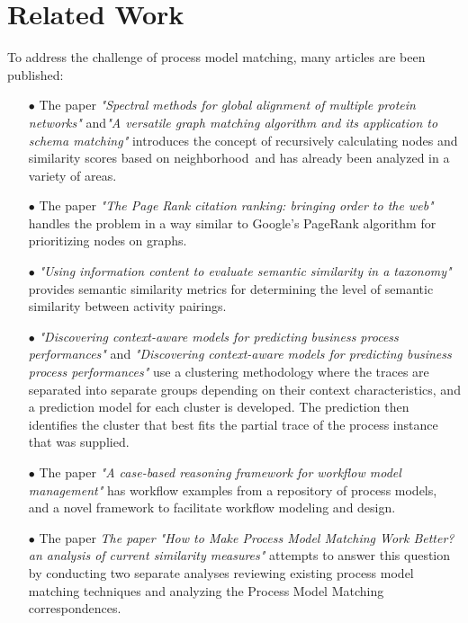 \documentclass[runningheads]{llncs}
\begin{document}
\section{Related Work}
To address the challenge of process model matching, many articles are been published:
\begin{itemize}

    \item[$\bullet$] The paper \textit{"Spectral methods for global alignment of multiple protein networks" }and\textit{"A versatile graph matching algorithm and its application to schema matching"} introduces the concept of recursively calculating nodes and similarity scores based on neighborhood and has already been analyzed in a variety of areas.\newline
    
    \item[$\bullet$]The paper \textit{"The Page Rank citation ranking: bringing order to the web"} handles the problem in a way similar to Google’s PageRank algorithm for prioritizing nodes on graphs.\newline
    
    \item[$\bullet$] \textit{"Using information content to evaluate semantic similarity in a taxonomy"} provides semantic similarity metrics for determining the level of semantic similarity between activity pairings.\newline
    
    \item[$\bullet$] \textit{"Discovering context-aware models for predicting business process performances"} and \textit{"Discovering context-aware models for predicting business process performances"} use a clustering methodology where the traces are separated into separate groups depending on their context characteristics, and a prediction model for each cluster is developed. The prediction then identifies the cluster that best fits the partial trace of the process instance that was supplied.\newline
    
     \item[$\bullet$] The paper \textit{ "A case-based reasoning framework for workflow model management"} has workflow examples from a repository of process models, and a novel framework to facilitate workflow modeling and design.\newline
     
       \item[$\bullet$] The paper \textit{The paper "How to Make Process Model Matching Work Better? an analysis of current similarity measures" }attempts to answer this question by conducting two separate analyses reviewing existing process model matching techniques and analyzing the Process Model Matching correspondences.\newline
       

\end{itemize}
\end{document}
